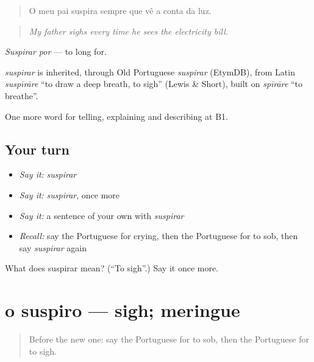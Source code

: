 \begin{quote}
O meu pai suspira sempre que vê a conta da luz.
\end{quote}

\begin{quote}
\emph{My father sighs every time he sees the electricity bill.}
\end{quote}

\emph{Suspirar por} — to long for.

\begin{cousinweb}
\emph{suspirar} is inherited, through Old Portuguese \emph{suspirar} (EtymDB), from Latin \emph{suspīrāre} \textquotedblleft{}to draw a deep breath, to sigh\textquotedblright{} (Lewis \& Short), built on \emph{spīrāre} \textquotedblleft{}to breathe\textquotedblright{}.
\end{cousinweb}

\begin{grammarlens}[title={What you've built}]
One more word for telling, explaining and describing at B1.
\end{grammarlens}

\subsection*{Your turn}
\begin{itemize}
\raggedright
  \item \emph{Say it:} \emph{suspirar}
  \item \emph{Say it:} \emph{suspirar}, once more
  \item \emph{Say it:} a sentence of your own with \emph{suspirar}
  \item \emph{Recall:} say the Portuguese for crying, then the Portuguese for to sob, then say \emph{suspirar} again
\end{itemize}

\begin{tcolorbox}[breakable,colback=teal!4,colframe=teal!35!black,title={Before you move on}]
What does suspirar mean? (\textquotedblleft{}To sigh\textquotedblright{}.) Say it once more.
\end{tcolorbox}
\section[o suspiro]{o suspiro — sigh; meringue}

\label{lesson:PT-C477-suspiro}



\begin{quote}
Before the new one: say the Portuguese for to sob, then the Portuguese for to sigh.
\end{quote}

